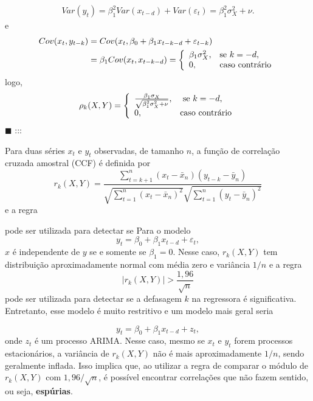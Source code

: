 \documentclass[
  letterpaper,
  DIV=11,
  numbers=noendperiod]{scrartcl}
\theoremstyle{definition}
\theoremstyle{definition}
\theoremstyle{plain}
\theoremstyle{plain}
\theoremstyle{remark}
\begin{document}
\begin{align}
Var(y_t)=\beta_1^2Var(x_{t-d})+Var(\varepsilon_t)=\beta_1^2\sigma^2_X+\nu.
\end{align} e \begin{align}
Cov(x_t,y_{t-k})&=Cov(x_t,\beta_0+\beta_1x_{t-k-d}+\varepsilon_{t-k})\\&=\beta_1Cov(x_t,x_{t-k-d})=\left\{\begin{array}{ll}\beta_1\sigma_X^2,&\hbox{se }k=-d,\\0,&\hbox{caso contrário}\end{array}\right.
\end{align} logo,
\[\rho_k(X,Y)=\left\{\begin{array}{ll}\frac{\beta_1\sigma_X}{\sqrt{\beta_1^2\sigma_X^2+\nu}},&\hbox{ se }k=-d,\\0,&\hbox{caso contrário}\end{array}\right.\]
\(\blacksquare\) :::

Para duas séries \(x_t\) e \(y_t\) observadas, de tamanho \(n\), a
função de correlação cruzada amostral (CCF) é definida por
\[r_k(X,Y)=\frac{\sum_{t=k+1}^n (x_t-\bar{x}_n)(y_{t-k}-\bar{y}_n)}{\sqrt{\sum_{t=1}^n(x_t-\bar{x}_n)^2}\sqrt{\sum_{t=1}^n(y_t-\bar{y}_n)^2}}\]
e a regra

pode ser utilizada para detectar se Para o modelo
\[y_t=\beta_0+\beta_1 x_{t-d}+\varepsilon_t,\] \(x\) é independente de
\(y\) se e somente se \(\beta_1=0\). Nesse caso, \(r_k(X,Y)\) tem
distribuição aproximadamente normal com média zero e variância \(1/n\) e
a regra \[|r_k(X,Y)|>\frac{1,96}{\sqrt{n}}\] pode ser utilizada para
detectar se a defasagem \(k\) na regressora é significativa. Entretanto,
esse modelo é muito restritivo e um modelo mais geral seria

\[y_t= \beta_0+\beta_1 x_{t-d}+z_t,\] onde \(z_t\) é um processo ARIMA.
Nesse caso, mesmo se \(x_t\) e \(y_t\) forem processos estacionários, a
variância de \(r_k(X,Y)\) não é mais aproximadamente \(1/n\), sendo
geralmente inflada. Isso implica que, ao utilizar a regra de comparar o
módulo de \(r_k(X,Y)\) com \(1,96/\sqrt{n}\), é possível encontrar
correlações que não fazem sentido, ou seja, \textbf{espúrias}.
\end{document}
